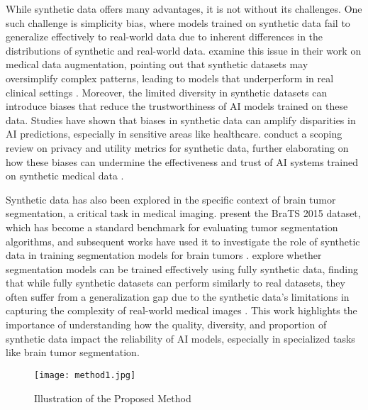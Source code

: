 While synthetic data offers many advantages, it is not without its challenges. One such challenge is simplicity bias, where models trained on synthetic data fail to generalize effectively to real-world data due to inherent differences in the distributions of synthetic and real-world data. \cite{c8} examine this issue in their work on medical data augmentation, pointing out that synthetic datasets may oversimplify complex patterns, leading to models that underperform in real clinical settings . Moreover, the limited diversity in synthetic datasets can introduce biases that reduce the trustworthiness of AI models trained on these data. Studies have shown that biases in synthetic data can amplify disparities in AI predictions, especially in sensitive areas like healthcare. \cite{c11} conduct a scoping review on privacy and utility metrics for synthetic data, further elaborating on how these biases can undermine the effectiveness and trust of AI systems trained on synthetic medical data .

Synthetic data has also been explored in the specific context of brain tumor segmentation, a critical task in medical imaging. \cite{c5} present the BraTS 2015 dataset, which has become a standard benchmark for evaluating tumor segmentation algorithms, and subsequent works have used it to investigate the role of synthetic data in training segmentation models for brain tumors . \cite{c12} explore whether segmentation models can be trained effectively using fully synthetic data, finding that while fully synthetic datasets can perform similarly to real datasets, they often suffer from a generalization gap due to the synthetic data's limitations in capturing the complexity of real-world medical images . This work highlights the importance of understanding how the quality, diversity, and proportion of synthetic data impact the reliability of AI models, especially in specialized tasks like brain tumor segmentation.

\begin{figure*}[!ht]
    \centering
    \texttt{[image: method1.jpg]} 
    \caption{Illustration of the Proposed Method}
    \label{fig:method_illustration}
\end{figure*}


